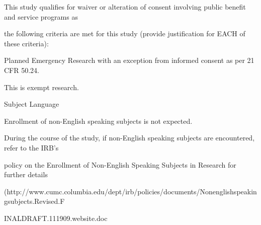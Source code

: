 \documentclass[10pt, letterpaper]{article}
\begin{document}
\noindent \makebox[0pt][l]{$\square$}\hspace{1.2em}This study qualifies for waiver or alteration of consent involving public benefit and service programs as

\begin{responsebox}

the following criteria are met for this study (provide justification for EACH of these criteria):

\vspace{0.5em}

\vspace{0.5em}

\end{responsebox}

\noindent \makebox[0pt][l]{$\square$}\hspace{1.2em} Planned Emergency Research with an exception from informed consent as per 21 CFR 50.24.

\vspace{0.5em}

\vspace{0.5em}

\noindent \makebox[0pt][l]{$\square$}\hspace{1.2em} This is exempt research.

\vspace{0.5em}

\vspace{0.5em}

Subject Language

Enrollment of non-English speaking subjects is not expected.

\vspace{0.5em}

\vspace{0.5em}

\begin{responsebox}

During the course of the study, if non-English speaking subjects are encountered, refer to the IRB's

policy on the Enrollment of Non-English Speaking Subjects in Research for further details

(http://www.cumc.columbia.edu/dept/irb/policies/documents/Nonenglishspeakingsubjects.Revised.F

\vspace{0.5em}

\vspace{0.5em}

\vspace{0.5em}

INALDRAFT.111909.website.doc

\vspace{0.5em}

\vspace{0.5em}

\end{responsebox}
\end{document}
